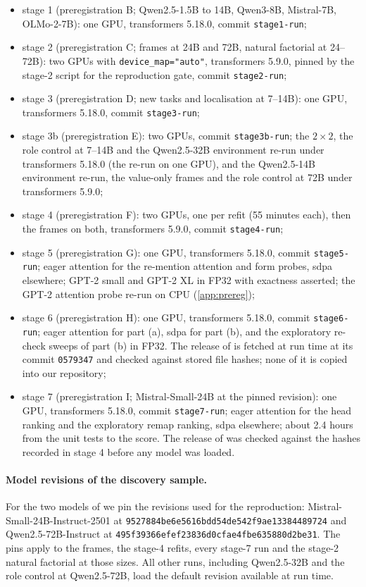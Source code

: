 \begin{itemize}\setlength\itemsep{1pt}
  \item stage 1 (preregistration B; Qwen2.5-1.5B to 14B, Qwen3-8B, Mistral-7B, OLMo-2-7B): one GPU, transformers 5.18.0, commit \texttt{stage1-run};
  \item stage 2 (preregistration C; frames at 24B and 72B, natural factorial at 24--72B): two GPUs with \texttt{device\_map="auto"}, transformers 5.9.0, pinned by the stage-2 script for the reproduction gate, commit \texttt{stage2-run};
  \item stage 3 (preregistration D; new tasks and localisation at 7--14B): one GPU, transformers 5.18.0, commit \texttt{stage3-run};
  \item stage 3b (preregistration E): two GPUs, commit \texttt{stage3b-run}; the $2{\times}2$, the role control at 7--14B and the Qwen2.5-32B environment re-run under transformers 5.18.0 (the re-run on one GPU), and the Qwen2.5-14B environment re-run, the value-only frames and the role control at 72B under transformers 5.9.0;
  \item stage 4 (preregistration F): two GPUs, one per refit (55 minutes each), then the frames on both, transformers 5.9.0, commit \texttt{stage4-run};
  \item stage 5 (preregistration G): one GPU, transformers 5.18.0, commit \texttt{stage5-run}; eager attention for the re-mention attention and form probes, sdpa elsewhere; GPT-2 small and GPT-2 XL in FP32 with exactness asserted; the GPT-2 attention probe re-run on CPU (\cref{app:prereg});
  \item stage 6 (preregistration H): one GPU, transformers 5.18.0, commit \texttt{stage6-run}; eager attention for part (a), sdpa for part (b), and the exploratory re-check sweeps of part (b) in FP32. The release of \citet{prakash2025lookbacks} is fetched at run time at its commit \texttt{0579347} and checked against stored file hashes; none of it is copied into our repository;
  \item stage 7 (preregistration I; Mistral-Small-24B at the pinned revision): one GPU, transformers 5.18.0, commit \texttt{stage7-run}; eager attention for the head ranking and the exploratory remap ranking, sdpa elsewhere; about 2.4 hours from the unit tests to the score. The release of \citet{anonymous2026fitted} was checked against the hashes recorded in stage 4 before any model was loaded.
\end{itemize}

\paragraph{Model revisions of the discovery sample.} For the two models of \citet{anonymous2026fitted} we pin the revisions used for the reproduction: Mistral-Small-24B-Instruct-2501 at \texttt{9527884be6e5616bdd54de542f9ae13384489724} and Qwen2.5-72B-Instruct at \texttt{495f39366efef23836d0cfae4fbe635880d2be31}. The pins apply to the frames, the stage-4 refits, every stage-7 run and the stage-2 natural factorial at those sizes. All other runs, including Qwen2.5-32B and the role control at Qwen2.5-72B, load the default revision available at run time.

